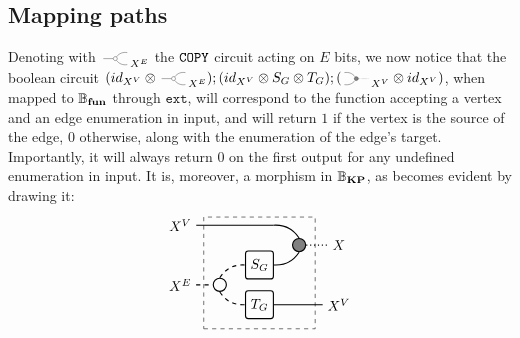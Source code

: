 \documentclass[preliminary,copyright,creativecommons,sharealike,noncommercial]{eptcs}
\begin{document}
\subsection{Mapping paths}
%
%
Denoting with $\COPYSym_{X^E}$ the $\texttt{COPY}$ circuit acting 
on $E$ bits, we now notice that the boolean circuit 
$(\Id{X^V} \Tensor \COPYSym_{X^E});(\Id{X^V} 
  \Tensor S_G \Tensor T_G);(\MATCHSym_{X^V} \Tensor \Id{X^V})$,
when mapped to $\mathbb{B}_\textbf{fun}$ through $\texttt{ext}$, will correspond to the 
function accepting a vertex and an edge enumeration in input, and 
will return $1$ if the vertex is the source of the edge, $0$ otherwise,
along with the enumeration of the edge's target.
Importantly, it will always return $0$ on the first output for 
any undefined enumeration in input. It is, moreover, a morphism 
in $\mathbb{B}_\textbf{KP}$, as becomes evident by drawing it:
%
%
\begin{equation*}
  \begin{tikzpicture}
    \node[draw, circle, radius=5pt, thick] (copy) at (-1,0.5) {};
    \node[draw, minimum height=20, minimum width=20, rounded corners=2, thick] (S) at (0,1) {$S_G$};
    \node[draw, minimum height=20, minimum width=20, rounded corners=2, thick] (T) at (0,0) {$T_G$};
    \node[draw, fill=gray, circle, radius=5pt, thick] (mat) at (1,1.5) {};

    \node[draw, dashed, minimum height=80, minimum width=80] (contour) at (0,0.8) {};

    \node (Xv) at (-2,2) {$X^V$};
    \node (Xe) at (-2,0.5) {$X^E$};
    \node (X) at (2,1.5) {$X$};
    \node (Xv2) at (2,0) {$X^V$};

    \draw[-, thick] (Xv) to (10pt,2);
    \draw[bend left, thick] (10pt,2) to (mat.north);
    \draw[bend right, thick] (S.east) to (mat.south);

    \draw[dashed, -, thick] (Xe) to (copy.west);

    \draw[dashed, bend left, thick] (copy.north) to (S.west);
    \draw[dashed, bend right, thick] (copy.south) to (T.west);

    \draw[-, dotted, thick] (mat.east) -- (X);
    \draw[-, thick] (T.east) -- (Xv2.west);
  \end{tikzpicture}
\end{equation*}
%
%
\end{document}
